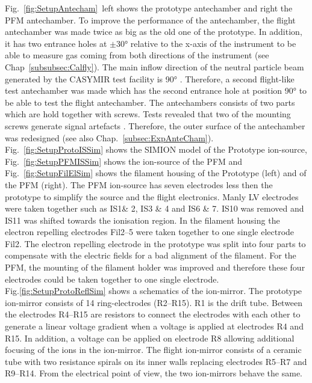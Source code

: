 	Fig.~\ref{fig:SetupAntecham}~left shows the prototype antechamber and right the PFM antechamber. To improve the performance of the antechamber, the flight antechamber was made twice as big as the old one of the prototype. In addition, it has two entrance holes at $\pm$30° relative to the x-axis of the instrument to be able to measure gas coming from both directions of the instrument (see Chap~\ref{subsubsec:Calfly}). The main inflow direction of the neutral particle beam generated by the CASYMIR test facility is 90° \cite{CASYMIR_Graf2004}. Therefore, a second flight-like test antechamber was made which has the second entrance hole at position 90° to be able to test the flight antechamber. The antechambers consists of two parts which are hold together with screws. Tests revealed that two of the mounting screws generate signal artefacts \cite{Meyer_2017_ante}. Therefore, the outer surface of the antechamber was redesigned (see also Chap.~\ref{subsec:ExpAnteCham}).\\
	Fig.~\ref{fig:SetupProtoISSim} shows the SIMION model of the Prototype ion-source, Fig.~\ref{fig:SetupPFMISSim} shows the ion-source of the PFM and Fig.~\ref{fig:SetupFilElSim} shows the filament housing of the Prototype (left) and of the PFM (right). The PFM ion-source has seven electrodes less then the prototype to simplify the source and the flight electronics. Manly LV electrodes were taken together such as IS1\& 2, IS3 \& 4 and IS6 \& 7. IS10 was removed and IS11 was shifted towards the ionisation region. In the filament housing the electron repelling electrodes Fil2--5 were taken together to one single electrode Fil2. The electron repelling electrode in the prototype was split into four parts to compensate with the electric fields for a bad alignment of the filament. For the PFM, the mounting of the filament holder was improved and therefore these four electrodes could be taken together to one single electrode.\\
	Fig.\ref{fig:SetupProtoReflSim} shows a schematics of the ion-mirror. The prototype ion-mirror consists of 14 ring-electrodes (R2--R15). R1 is the drift tube. Between the electrodes R4--R15 are resistors to connect the electrodes with each other to generate a linear voltage gradient when a voltage is applied at electrodes R4 and R15. In addition, a voltage can be applied on electrode R8 allowing additional focusing of the ions in the ion-mirror. The flight ion-mirror consists of a ceramic tube with two resistance spirals on its inner walls replacing electrodes R5--R7 and R9--R14. From the electrical point of view, the two ion-mirrors behave the same.\\
